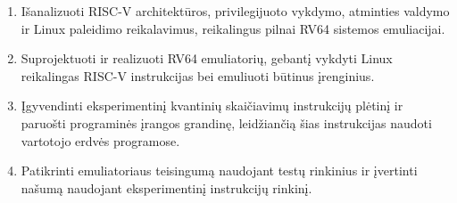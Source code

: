 \begin{enumerate}
    \item Išanalizuoti RISC-V architektūros, privilegijuoto vykdymo, atminties valdymo ir Linux paleidimo reikalavimus, reikalingus pilnai RV64 sistemos emuliacijai.

    \item Suprojektuoti ir realizuoti RV64 emuliatorių, gebantį vykdyti Linux reikalingas RISC-V instrukcijas bei emuliuoti būtinus įrenginius.

    \item Įgyvendinti eksperimentinį kvantinių skaičiavimų instrukcijų plėtinį ir paruošti programinės įrangos grandinę, leidžiančią šias instrukcijas naudoti vartotojo erdvės programose.

    \item Patikrinti emuliatoriaus teisingumą naudojant testų rinkinius ir įvertinti našumą naudojant eksperimentinį instrukcijų rinkinį.
\end{enumerate}
